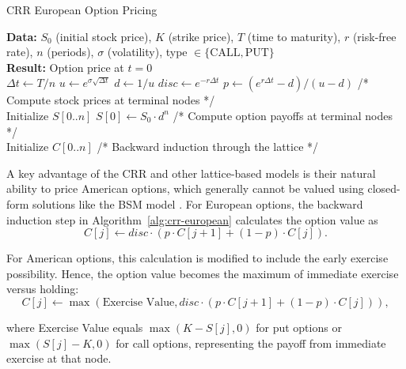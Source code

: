 \documentclass[english,12pt,a4paper,pdftex,sci,utf8]{aaltothesis}
\begin{document}
\begin{algorithm}
\caption{CRR European Option Pricing}
\label{alg:crr-european}
\textbf{Data:} $S_0$ (initial stock price), $K$ (strike price), $T$ (time to maturity), $r$ (risk-free rate), $n$ (periods), $\sigma$ (volatility), type $\in \{\text{CALL}, \text{PUT}\}$\\
\textbf{Result:} Option price at $t=0$\\
$\Delta t \gets T/n$\;
$u \gets e^{\sigma\sqrt{\Delta t}}$\;
$d \gets 1/u$\;
$disc \gets e^{-r\Delta t}$\;
$p \gets (e^{r\Delta t} - d)/(u - d)$\;
/* Compute stock prices at terminal nodes */\\
Initialize $S[0..n]$\;
$S[0] \gets S_0 \cdot d^n$\;
/* Compute option payoffs at terminal nodes */\\
Initialize $C[0..n]$\;
/* Backward induction through the lattice */\\

\;
\end{algorithm}

A key advantage of the CRR and other lattice-based models is their natural ability to price American options, which generally cannot be valued using closed-form solutions like the BSM model \cite{wilmott2013paul}. For European options, the backward induction step in Algorithm~\ref{alg:crr-european} calculates the option value as
\begin{equation*}
C[j] \gets disc \cdot (p \cdot C[j+1] + (1-p) \cdot C[j]).
\end{equation*}

For American options, this calculation is modified to include the early exercise possibility. Hence, the option value becomes the maximum of immediate exercise versus holding:
\begin{equation*}
C[j] \gets \max(\text{Exercise Value}, disc \cdot (p \cdot C[j+1] + (1-p) \cdot C[j])),
\end{equation*}

where Exercise Value equals $\max(K - S[j], 0)$ for put options or $\max(S[j] - K, 0)$ for call options, representing the payoff from immediate exercise at that node.
\end{document}
